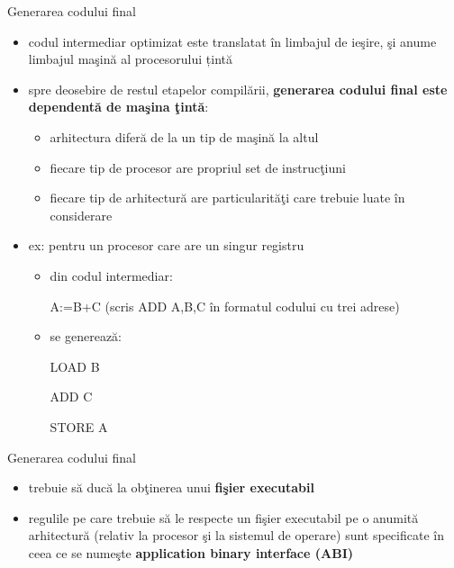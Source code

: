 \documentclass[pdf]{beamer}
\begin{document}
\begin{frame}{Generarea codului final}
\begin{itemize}
\item
codul intermediar optimizat este translatat în limbajul de ieşire, şi anume limbajul maşină al procesorului țintă
\newline

\item
spre deosebire de restul etapelor compilării, \textbf{generarea codului final este dependentă de maşina ţintă}:
\begin{itemize}
\item
arhitectura diferă de la un tip de maşină la altul
\item
fiecare tip de procesor are propriul set de instrucţiuni
\item
fiecare tip de arhitectură are particularităţi care trebuie luate în considerare
\end{itemize}

\item
ex: pentru un procesor care are un singur registru

\begin{itemize}
\item
din codul intermediar:

A:=B+C (scris ADD A,B,C în formatul codului cu trei adrese)

\item
se generează: 

LOAD B

ADD C

STORE A
\end{itemize}
\end{itemize}
\end{frame}



\begin{frame}{Generarea codului final}
\begin{itemize}
\item
trebuie să ducă la obţinerea unui \textbf{fişier executabil}
\newline

\item
regulile pe care trebuie să le respecte un fişier executabil pe o anumită arhitectură (relativ la procesor şi la sistemul de operare) sunt specificate în ceea ce se numeşte \textbf{application binary interface (ABI)}

\end{itemize}
\end{frame}
\end{document}
